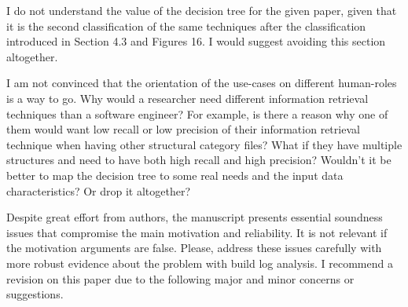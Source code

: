 \documentclass[10pt,a4wide]{article}
\renewenvironment{leftbar}{%
	\vspace{0.1cm}
	\def\FrameCommand{\vrule width 0.4pt \hspace{15pt}}%
	\MakeFramed {\advance\hsize-\width \FrameRestore}}%
{\endMakeFramed\vspace{0.1cm}}
\begin{document}
\begin{leftbar}
I do not understand the value of the decision tree for the given paper, given that it is the second classification of the same techniques after the classification introduced in Section 4.3 and Figures 16. I would suggest avoiding this section altogether.

I am not convinced that the orientation of the use-cases on different human-roles is a way to go. Why would a researcher need different information retrieval techniques than a software engineer? For example, is there a reason why one of them would want low recall or low precision of their information retrieval technique when having other structural category files? What if they have multiple structures and need to have both high recall and high precision? Wouldn't it be better to map the decision tree to some real needs and the input data characteristics? Or drop it altogether?



Despite great effort from authors, the manuscript presents essential soundness issues that compromise the main motivation and reliability. It is not relevant if the motivation arguments are false.  Please, address these issues carefully with more robust evidence about the problem with build log analysis. I recommend a revision on this paper due to the following major and minor concerns or suggestions.
\end{leftbar}
\end{document}
